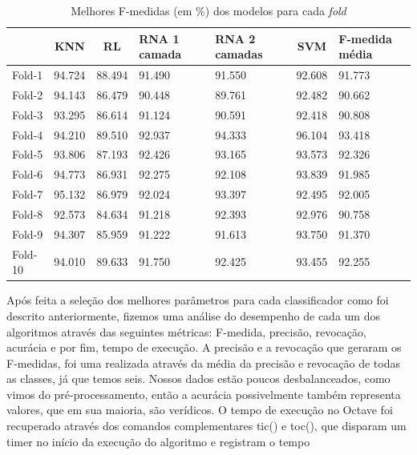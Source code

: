 \documentclass[10pt, conference, compsocconf]{IEEEtran}
\begin{document}
\begin{table}[!t]
\renewcommand{\arraystretch}{1.3}
\caption{Melhores F-medidas (em \%) dos modelos para cada \textit{fold}}
\label{fmedidas}
\centering
    \begin{tabular}{|l|c|c|p{0.9cm}|p{0.9cm}|c|p{0.8cm}|}
    \hline
    & KNN & RL & RNA 1 camada & RNA 2
    camadas & SVM & F-medida média\\
    \hline
    Fold-1 & 94.724 & 88.494 & 91.490 & 91.550 & 92.608 & 91.773 \\ 
    Fold-2 & 94.143 & 86.479 & 90.448 & 89.761 & 92.482 & 90.662 \\
    Fold-3 & 93.295 & 86.614 & 91.124 & 90.591 & 92.418 & 90.808 \\ 
    Fold-4 & 94.210 & 89.510 & 92.937 & 94.333 & 96.104 & 93.418 \\ 
    Fold-5 & 93.806 & 87.193 & 92.426 & 93.165 & 93.573 & 92.326 \\ 
    Fold-6 & 94.773 & 86.931 & 92.275 & 92.108 & 93.839 & 91.985 \\ 
    Fold-7 & 95.132 & 86.979 & 92.024 & 93.397 & 92.495 & 92.005 \\ 
    Fold-8 & 92.573 & 84.634 & 91.218 & 92.393 & 92.976 & 90.758 \\ 
    Fold-9 & 94.307 & 85.959 & 91.222 & 91.613 & 93.750 & 91.370 \\ 
    Fold-10 & 94.010 & 89.633 & 91.750 & 92.425 & 93.455 & 92.255 \\
    \hline
    \end{tabular}
\end{table}


Após feita a seleção dos melhores parâmetros para cada classificador como foi 
descrito anteriormente, fizemos uma análise do desempenho de cada um dos 
algoritmos através das seguintes métricas: F-medida, precisão, revocação, 
acurácia e por fim, tempo de execução. A precisão e a revocação que geraram 
os F-medidas, foi uma realizada através da média da precisão e revocação de 
todas as classes, já que temos seis. Nossos dados estão poucos desbalanceados, 
como vimos do pré-processamento, então a acurácia possivelmente também 
representa valores, que em sua maioria, são verídicos. O tempo de execução 
no Octave foi recuperado através dos comandos complementares tic() e toc(), 
que disparam um timer no início da execução do algoritmo e registram o tempo 
\end{document}
